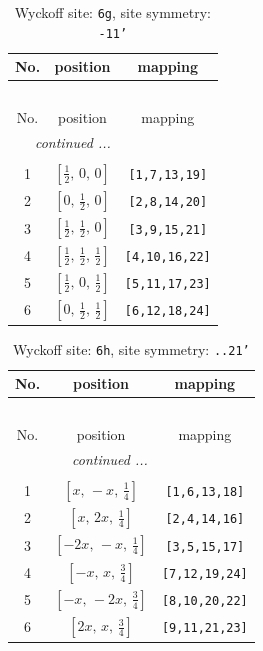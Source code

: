 \documentclass[fleqn,8pt]{jsarticle}
\begin{document}
\renewcommand{\arraystretch}{1.2}
\begin{longtable}{ccc}
\caption{Wyckoff site: {\tt 6g}, site symmetry: {\tt -11'}}
 \\
 \hline \hline
No. & position & mapping \\ \hline \endfirsthead

\multicolumn{2}{l}{\tablename\ \thetable{}} \\
 \hline \hline
No. & position & mapping \\ \hline \endhead

 \hline \hline
\multicolumn{2}{r}{\footnotesize\it continued ...} \\ \endfoot

 \hline \hline
\multicolumn{2}{r}{} \\ \endlastfoot

1 & $\left[ \frac{1}{2},\, 0,\, 0 \right]$ & {\tt [1,7,13,19]} \\ \hline
2 & $\left[ 0,\, \frac{1}{2},\, 0 \right]$ & {\tt [2,8,14,20]} \\ \hline
3 & $\left[ \frac{1}{2},\, \frac{1}{2},\, 0 \right]$ & {\tt [3,9,15,21]} \\ \hline
4 & $\left[ \frac{1}{2},\, \frac{1}{2},\, \frac{1}{2} \right]$ & {\tt [4,10,16,22]} \\ \hline
5 & $\left[ \frac{1}{2},\, 0,\, \frac{1}{2} \right]$ & {\tt [5,11,17,23]} \\ \hline
6 & $\left[ 0,\, \frac{1}{2},\, \frac{1}{2} \right]$ & {\tt [6,12,18,24]} \\
\end{longtable}
\renewcommand{\arraystretch}{1.2}
\begin{longtable}{ccc}
\caption{Wyckoff site: {\tt 6h}, site symmetry: {\tt ..21'}}
 \\
 \hline \hline
No. & position & mapping \\ \hline \endfirsthead

\multicolumn{2}{l}{\tablename\ \thetable{}} \\
 \hline \hline
No. & position & mapping \\ \hline \endhead

 \hline \hline
\multicolumn{2}{r}{\footnotesize\it continued ...} \\ \endfoot

 \hline \hline
\multicolumn{2}{r}{} \\ \endlastfoot

1 & $\left[ x,\, - x,\, \frac{1}{4} \right]$ & {\tt [1,6,13,18]} \\ \hline
2 & $\left[ x,\, 2 x,\, \frac{1}{4} \right]$ & {\tt [2,4,14,16]} \\ \hline
3 & $\left[ - 2 x,\, - x,\, \frac{1}{4} \right]$ & {\tt [3,5,15,17]} \\ \hline
4 & $\left[ - x,\, x,\, \frac{3}{4} \right]$ & {\tt [7,12,19,24]} \\ \hline
5 & $\left[ - x,\, - 2 x,\, \frac{3}{4} \right]$ & {\tt [8,10,20,22]} \\ \hline
6 & $\left[ 2 x,\, x,\, \frac{3}{4} \right]$ & {\tt [9,11,21,23]} \\
\end{longtable}
\end{document}
